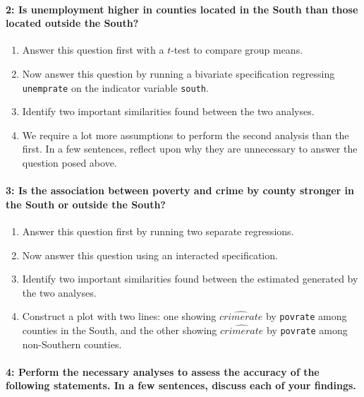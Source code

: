 \documentclass[
]{article}
\begin{document}
\paragraph{2: Is unemployment higher in counties located in the South
than those located outside the
South?}\label{is-unemployment-higher-in-counties-located-in-the-south-than-those-located-outside-the-south}

\begin{enumerate}
\def\labelenumi{\alph{enumi}.}
\item
  Answer this question first with a \(t\)-test to compare group means.
\item
  Now answer this question by running a bivariate specification
  regressing \texttt{unemprate} on the indicator variable
  \texttt{south}.
\item
  Identify two important similarities found between the two analyses.
\item
  We require a lot more assumptions to perform the second analysis than
  the first. In a few sentences, reflect upon why they are unnecessary
  to answer the question posed above.
\end{enumerate}

\paragraph{3: Is the association between poverty and crime by county
stronger in the South or outside the
South?}\label{is-the-association-between-poverty-and-crime-by-county-stronger-in-the-south-or-outside-the-south}

\begin{enumerate}
\def\labelenumi{\alph{enumi}.}
\item
  Answer this question first by running two separate regressions.
\item
  Now answer this question using an interacted specification.
\item
  Identify two important similarities found between the estimated
  generated by the two analyses.
\item
  Construct a plot with two lines: one showing
  \(\widehat{\textit{crimerate}}\) by \texttt{povrate} among counties in
  the South, and the other showing \(\widehat{\textit{crimerate}}\) by
  \texttt{povrate} among non-Southern counties.
\end{enumerate}

\paragraph{4: Perform the necessary analyses to assess the accuracy of
the following statements. In a few sentences, discuss each of your
findings.}\label{perform-the-necessary-analyses-to-assess-the-accuracy-of-the-following-statements.-in-a-few-sentences-discuss-each-of-your-findings.}
\end{document}
